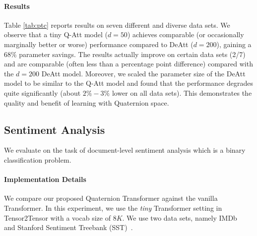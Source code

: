 \documentclass[11pt,a4paper]{article}
\begin{document}

\paragraph{Results}
Table \ref{tab:ptc} reports results on seven different and diverse data sets. We observe that a tiny Q-Att model ($d=50$) achieves comparable (or occasionally marginally better or worse) performance compared to DeAtt ($d=200$), gaining a $68\%$ parameter savings. The results actually improve on certain data sets (2/7) and are comparable (often less than a percentage point difference) compared with the $d=200$ DeAtt model. Moreover, we scaled the parameter size of the DeAtt model to be similar to the Q-Att model and found that the performance degrades quite significantly (about $2\%-3\%$ lower on all data sets). This demonstrates the quality and benefit of learning with Quaternion space.

\subsection{Sentiment Analysis}
We evaluate on the task of document-level sentiment analysis which is a binary classification problem.

\paragraph{Implementation Details} We compare our proposed Quaternion Transformer against the vanilla Transformer. In this experiment, we use the \textit{tiny} Transformer setting in Tensor2Tensor with a vocab size of $8K$. We use two data sets, namely IMDb~\cite{IMDB} and Stanford Sentiment Treebank (SST)~\cite{socher2013recursive}.

\end{document}
